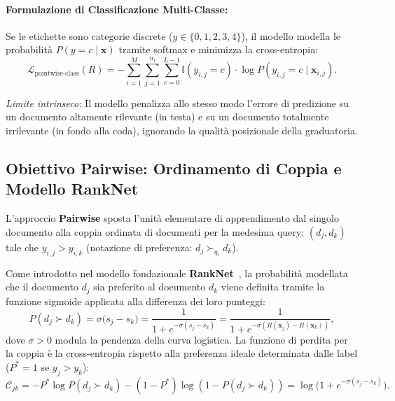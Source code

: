 \paragraph{Formulazione di Classificazione Multi-Classe:}
Se le etichette sono categorie discrete ($y \in \{0, 1, 2, 3, 4\}$), il modello modella le probabilit\`a $P(y = c \mid \mathbf{x})$ tramite softmax e minimizza la cross-entropia:
\begin{equation}
\mathcal{L}_{\text{pointwise-class}}(R) = - \sum_{i=1}^M \sum_{j=1}^{n_i} \sum_{c=0}^{L-1} \mathbb{I}(y_{i,j} = c) \cdot \log P(y_{i,j} = c \mid \mathbf{x}_{i,j}).
\end{equation}

\textit{Limite intrinseco:} Il modello penalizza allo stesso modo l'errore di predizione su un documento altamente rilevante (in testa) e su un documento totalmente irrilevante (in fondo alla coda), ignorando la qualit\`a posizionale della graduatoria.

\FloatBarrier
\subsection{Obiettivo Pairwise: Ordinamento di Coppia e Modello RankNet}
\label{subsec:obiettivo-pairwise-ranknet}
L'approccio \textbf{Pairwise} sposta l'unit\`a elementare di apprendimento dal singolo documento alla coppia ordinata di documenti per la medesima query: $(d_j, d_k)$ tale che $y_{i,j} > y_{i,k}$ (notazione di preferenza: $d_j \succ_{q_i} d_k$).

Come introdotto nel modello fondazionale \textbf{RankNet}~\cite{burges2005}, la probabilit\`a modellata che il documento $d_j$ sia preferito al documento $d_k$ viene definita tramite la funzione sigmoide applicata alla differenza dei loro punteggi:
\begin{equation}
P(d_j \succ d_k) = \sigma\big(s_j - s_k\big) = \frac{1}{1 + e^{-\sigma(s_j - s_k)}} = \frac{1}{1 + e^{-\sigma(R(\mathbf{x}_j) - R(\mathbf{x}_k))}},
\end{equation}
dove $\sigma > 0$ modula la pendenza della curva logistica.
La funzione di perdita per la coppia \`e la cross-entropia rispetto alla preferenza ideale determinata dalle label ($P^* = 1$ se $y_j > y_k$):
\begin{equation}
\mathcal{C}_{jk} = - P^* \log P(d_j \succ d_k) - (1 - P^*) \log (1 - P(d_j \succ d_k)) = \log \big( 1 + e^{-\sigma(s_j - s_k)} \big).
\label{eq:ranknet-loss-formula}
\end{equation}

